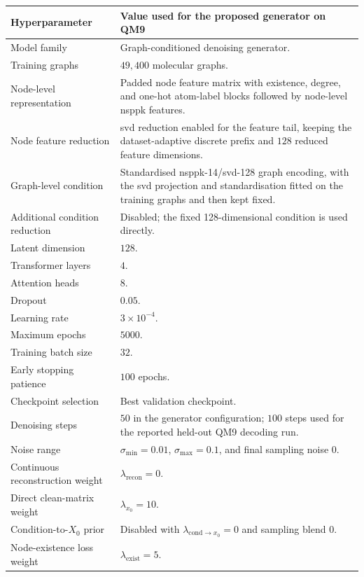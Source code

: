 \begin{table}[p]
\centering
\footnotesize
\begin{tabularx}{\textwidth}{@{}p{}X@{}}
\toprule
Hyperparameter & Value used for the proposed generator on QM9 \\
\midrule
Model family & Graph-conditioned denoising generator. \\
Training graphs & \(49{,}400\) molecular graphs. \\
Node-level representation & Padded node feature matrix with existence, degree, and one-hot atom-label blocks followed by node-level \gls{nsppk} features. \\
Node feature reduction & \gls{svd} reduction enabled for the feature tail, keeping the dataset-adaptive discrete prefix and \(128\) reduced feature dimensions. \\
Graph-level condition & Standardised \gls{nsppk}-14/\gls{svd}-128 graph encoding, with the \gls{svd} projection and standardisation fitted on the training graphs and then kept fixed. \\
Additional condition reduction & Disabled; the fixed 128-dimensional condition is used directly. \\
Latent dimension & \(128\). \\
Transformer layers & \(4\). \\
Attention heads & \(8\). \\
Dropout & \(0.05\). \\
Learning rate & \(3\times10^{-4}\). \\
Maximum epochs & \(5000\). \\
Training batch size & \(32\). \\
Early stopping patience & \(100\) epochs. \\
Checkpoint selection & Best validation checkpoint. \\
Denoising steps & \(50\) in the generator configuration; \(100\) steps used for the reported held-out QM9 decoding run. \\
Noise range & \(\sigma_{\min}=0.01\), \(\sigma_{\max}=0.1\), and final sampling noise \(0\). \\
Continuous reconstruction weight & \(\lambda_{\mathrm{recon}}=0\). \\
Direct clean-matrix weight & \(\lambda_{x_0}=10\). \\
Condition-to-\(X_0\) prior & Disabled with \(\lambda_{\mathrm{cond}\rightarrow x_0}=0\) and sampling blend \(0\). \\
Node-existence loss weight & \(\lambda_{\mathrm{exist}}=5\). \\

\end{tabularx}
\end{table}
